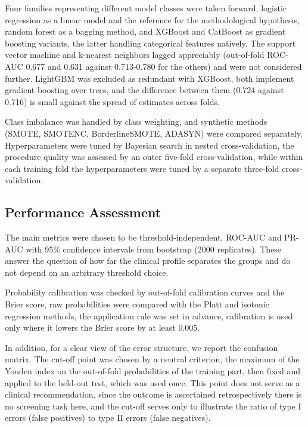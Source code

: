 \documentclass[pdflatex,sn-basic,Numbered]{sn-jnl}
\begin{document}
Four families representing different model classes were taken forward, logistic regression as a linear model and the reference for the methodological hypothesis, random forest as a bagging method, and XGBoost and CatBoost as gradient boosting variants, the latter handling categorical features natively. The support vector machine and k-nearest neighbors lagged appreciably (out-of-fold ROC-AUC 0.677 and 0.631 against 0.713-0.780 for the others) and were not considered further. LightGBM was excluded as redundant with XGBoost, both implement gradient boosting over trees, and the difference between them (0.724 against 0.716) is small against the spread of estimates across folds.

Class imbalance was handled by class weighting, and synthetic methods (SMOTE, SMOTENC, BorderlineSMOTE, ADASYN) were compared separately. Hyperparameters were tuned by Bayesian search in nested cross-validation, the procedure quality was assessed by an outer five-fold cross-validation, while within each training fold the hyperparameters were tuned by a separate three-fold cross-validation.

\subsection{Performance Assessment}\label{subsec2_9}

The main metrics were chosen to be threshold-independent, ROC-AUC and PR-AUC with 95\% confidence intervals from bootstrap (2000 replicates). These answer the question of how far the clinical profile separates the groups and do not depend on an arbitrary threshold choice.

Probability calibration was checked by out-of-fold calibration curves and the Brier score, raw probabilities were compared with the Platt and isotonic regression methods, the application rule was set in advance, calibration is used only where it lowers the Brier score by at least 0.005.

In addition, for a clear view of the error structure, we report the confusion matrix. The cut-off point was chosen by a neutral criterion, the maximum of the Youden index on the out-of-fold probabilities of the training part, then fixed and applied to the held-out test, which was used once. This point does not serve as a clinical recommendation, since the outcome is ascertained retrospectively there is no screening task here, and the cut-off serves only to illustrate the ratio of type I errors (false positives) to type II errors (false negatives).
\end{document}
